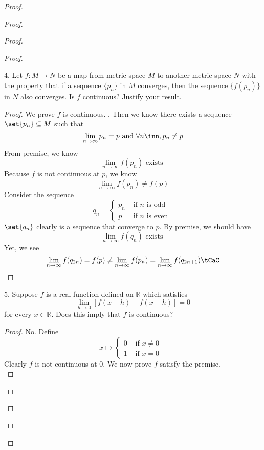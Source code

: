 \documentclass{report}
\begin{document}
\begin{proof}
\begin{proof}
\begin{proof}
\begin{proof}
\begin{question}{}{}
4. Let \(f : M \rightarrow N\) be a map from metric space \(M\) to another metric space \(N\) with the property
that if a sequence \(\{p_n\}\) in \(M\) converges, then the sequence \(\{f(p_n)\}\) in \(N\) also converges. Is
\(f\) continuous? Justify your result.
\end{question}
\begin{proof}
  We prove $f$ is continuous. . Then we know there exists a sequence $\set{p_n}\subseteq M$ such that 
  \begin{equation*}
  \lim_{n\to\infty}p_n=p \text{ and } \forall n\inn, p_n\neq p
  \end{equation*}
From premise, we know 
\begin{equation*}
\lim_{n\to\infty} f(p_n)\text{ exists }
\end{equation*}
Because $f$ is not continuous at  $p$, we know 
 \begin{equation*}
\lim_{n\to\infty}f(p_n)\neq f(p)
\end{equation*}
Consider the sequence 
\begin{equation*}
q_{n}=\begin{cases}
p_n& \text{ if $n$ is odd }\\
p & \text{ if $n$ is even }
\end{cases}
\end{equation*}
$\set{q_n}$ clearly is a sequence that converge to $p$. By premise, we should have 
\begin{equation*}
\lim_{n\to\infty}f(q_n)\text{ exists }
\end{equation*}
Yet, we see 
\begin{equation*}
\lim_{n\to\infty}f(q_{2n})=f(p)\neq \lim_{n\to\infty}f(p_n)=\lim_{n\to\infty}f(q_{2n+1})\tCaC
\end{equation*}
\end{proof}
\begin{question}{}{}
5. Suppose \(f\) is a real function defined on \(\mathbb{R}\) which satisfies
\[
\lim_{h \rightarrow 0} [f(x + h) - f(x - h)] = 0
\]
for every \(x \in \mathbb{R}\). Does this imply that \(f\) is continuous?

\end{question}
\begin{proof}
No. Define 
\begin{equation*}
x\mapsto \begin{cases}
  0& \text{ if $x\neq 0$ }\\
  1& \text{ if $x=0$ }
\end{cases}
\end{equation*}
Clearly $f$ is not continuous at $0$. We now prove  $f$ satisfy the premise.\\


\end{proof}
\end{proof}
\end{proof}
\end{proof}
\end{proof}
\end{document}
